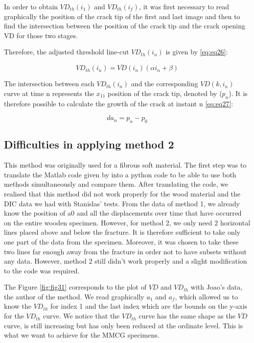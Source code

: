 In order to obtain $VD_{th}(i_1)$ and $VD_{th}(i_f)$, it was first necessary to read graphically the position of the crack tip of the first and last image and then to find the intersection between the position of the crack tip and the crack opening VD for those two stages.

Therefore, the adjusted threshold line-cut $VD_{th}(i_n)$ is given by \ref{eq:eq26}:

\begin{equation}
	VD_{th}(i_n)=\overline{VD}(i_n)(\alpha i_n +\beta)
	\label{eq:eq26}
\end{equation}

The intersection between each $VD_{th}(i_n)$ and the corresponding $VD(k, i_n)$ curve at time n represents the $x_{11}$ position of the crack tip, denoted by ($p_n$).
It is therefore possible to calculate the growth of the crack at instant n \ref{eq:eq27}:

\begin{equation}
	da_n=p_n-p_0
	\label{eq:eq27}
\end{equation}

\subsection{Difficulties in applying method 2}

This method was originally used for a fibrous soft material. The first step was to translate the Matlab code given by \citep{FilhoJ2022} into a python code to be able to use both methods simultaneously and compare them.
After translating the code, we realised that this method did not work properly for the wood material and the DIC data we had with Stanislas' tests.
From the data of method 1, we already know the position of a0 and all the displacements over time that have occurred on the entire wooden specimen. However, for method 2, we only need 2 horizontal lines placed above and below the fracture. It is therefore sufficient to take only one part of the data from the specimen. Moreover, it was chosen to take these two lines far enough away from the fracture in order not to have subsets without any data.
However, method 2 still didn't work properly and a slight modification to the code was required.

The Figure \ref{fig:fig31} corresponds to the plot of $\overline{VD}$ and $VD_{th}$ with Joao's data, the author of the method. We read graphically $a_1$ and $a_f$, which allowed us to know the $VD_{th}$ for index 1 and the last index which are the bounds on the y-axis for the $VD_{th}$ curve. We notice that the $VD_{th}$ curve has the same shape as the $\overline{VD}$ curve, is still increasing but has only been reduced at the ordinate level. This is what we want to achieve for the MMCG specimens.

